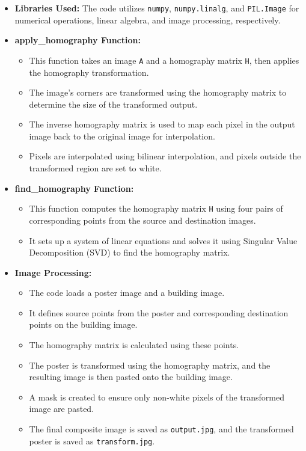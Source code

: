 \documentclass{article}
\begin{document}
\begin{itemize}
    \item \textbf{Libraries Used:} The code utilizes \texttt{numpy}, \texttt{numpy.linalg}, and \texttt{PIL.Image} for numerical operations, linear algebra, and image processing, respectively.
    
    \item \textbf{apply\_homography Function:} 
    \begin{itemize}
        \item This function takes an image \texttt{A} and a homography matrix \texttt{H}, then applies the homography transformation.
        \item The image's corners are transformed using the homography matrix to determine the size of the transformed output.
        \item The inverse homography matrix is used to map each pixel in the output image back to the original image for interpolation.
        \item Pixels are interpolated using bilinear interpolation, and pixels outside the transformed region are set to white.
    \end{itemize}
    
    \item \textbf{find\_homography Function:} 
    \begin{itemize}
        \item This function computes the homography matrix \texttt{H} using four pairs of corresponding points from the source and destination images.
        \item It sets up a system of linear equations and solves it using Singular Value Decomposition (SVD) to find the homography matrix.
    \end{itemize}
    
    \item \textbf{Image Processing:}
    \begin{itemize}
        \item The code loads a poster image and a building image.
        \item It defines source points from the poster and corresponding destination points on the building image.
        \item The homography matrix is calculated using these points.
        \item The poster is transformed using the homography matrix, and the resulting image is then pasted onto the building image.
        \item A mask is created to ensure only non-white pixels of the transformed image are pasted.
        \item The final composite image is saved as \texttt{output.jpg}, and the transformed poster is saved as \texttt{transform.jpg}.
    \end{itemize}
\end{itemize}
\end{document}
